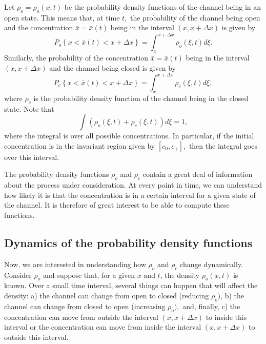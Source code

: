 Let $\rho_{o}=\rho_{o}\left(  x,t\right)  $ be the probability density
functions of the channel being in an open state. This means that, at time $t,$
the probability of the channel being open and the concentration $\bar{x}%
=\bar{x}(t)$ being in the interval $(x,x+\Delta x)$ is given by
\begin{equation}
P_{o}\left\{  x<\bar{x}(t)<x+\Delta x\right\}  =\int_{x}^{x+\Delta x}\rho
_{o}\left(  \xi,t\right)  d\xi. \label{probopen}%
\end{equation}
Similarly, the probability of the concentration $\bar{x}=\bar{x}(t)$ being in
the interval $(x,x+\Delta x)$ and the channel being closed is given by%
\begin{equation}
P_{c}\left\{  x<\bar{x}(t)<x+\Delta x\right\}  =\int_{x}^{x+\Delta x}\rho
_{c}\left(  \xi,t\right)  d\xi, \label{prob_closed}%
\end{equation}
where $\rho_c$ is the probability density
function of the channel being in the closed state. Note that
\begin{equation}
\int\left(  \rho_{o}\left(  \xi,t\right)  +\rho_{c}\left(  \xi,t\right)
\right)  d\xi=1, \label{integral1}
\end{equation}
where the integral is over all possible concentrations. In particular, if the initial
concentration is in the invariant region given by $\left[  c_{0}%
,c_{+}\right],$ then the integral goes over this interval.

The probability density functions $\rho_o$ and $\rho_c$ contain a great deal of information about the
process under consideration. At every point in time, we can understand how likely it is that the concentration is in a certain interval for a given state of the channel. 
It is therefore of great interest to be able to compute these functions.


\bigskip

\subsection{Dynamics of the probability density functions}

Now, we are interested in understanding how $\rho_{o}$ and $\rho_{c}$ change
dynamically. 
Consider $\rho_{o}$ and suppose that, for a given $x$ and $t$, the
density $\rho_{o}(x,t)$ is known. Over a small time interval, several things
can happen that will affect the density: a) the channel can change from open to
closed (reducing $\rho_{o})$, b) the channel can change from closed to open
(increasing $\rho_{o}),$ and, finally, c) the concentration can move from
outside the interval $(x,x+\Delta x)$ to inside this interval or the
concentration can move from inside the interval $(x,x+\Delta x)$ to outside
this interval.

